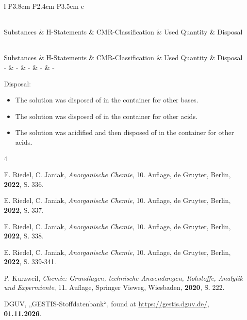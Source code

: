 \documentclass[
	a4paper,										%
	12pt,											%
	twoside,										%
	headsepline,								%
	footsepline,									%
	captions=tableheading,					%
]{scrartcl}
\newcommand{\langetabelle}[6]{  %
	\begin{centering}           %
		{\begin{longtable}[#3]{#4}
				\caption{#2\label{tab: #1}}\\				
				\hline
				#5
				\hline
				\endfirsthead
                \caption{#2\label{tab: #1}}\\
				\hline
				#5
				\hline
				\endhead
				#6												
				\hline 
		\end{longtable}}
\end{centering}}
\begin{document}
\langetabelle
	{KMR_leer}
	{Carcinogenic, mutagenic or reprotoxic hazardous substances used (CMR).}
	{H}
	{l P{3.8cm} P{2.4cm} P{3.5cm} c}
	{Substances & H-Statements & CMR-Classification & Used Quantity & Disposal \\}
	{ - & - & - & - & - \\}
	
Disposal: \\
\begin{itemize}
	\item[(1)] The solution was disposed of in the container for other bases. 
	\item[(2)] The solution was disposed of in the container for other acids.
	\item[(3)] The solution was acidified and then disposed of in the container for other acids.
\end{itemize}	

\begin{thebibliography}{4} %

						{E. Riedel, C. Janiak}, 
			\textit	{Anorganische Chemie}, 
						{10. Auflage}, 
						{de Gruyter}, 
						{Berlin}, 
			\textbf	{2022}, 
			S.			{336}.

						{E. Riedel, C. Janiak}, 
			\textit	{Anorganische Chemie}, 
						{10. Auflage}, 
						{de Gruyter}, 
						{Berlin}, 
			\textbf	{2022}, 
			S.			{337}.

						{E. Riedel, C. Janiak}, 
			\textit	{Anorganische Chemie}, 
						{10. Auflage}, 
						{de Gruyter}, 
						{Berlin}, 
			\textbf	{2022}, 
			S.			{338}.
	
						{E. Riedel, C. Janiak}, 
			\textit	{Anorganische Chemie}, 
						{10. Auflage}, 
						{de Gruyter}, 
						{Berlin}, 
			\textbf	{2022}, 
			S.			{339-341}.

						{P. Kurzweil}, 
			\textit	{Chemie: Grundlagen, technische Anwendungen, Rohstoffe, Analytik und Expermiente}, 
						{11. Auflage}, 
						{Springer Vieweg}, 
						{Wiesbaden}, 
			\textbf	{2020}, 
			S.			{222}.


						{DGUV}, 
						„{GESTIS-Stoffdatenbank}“, found at
			\url		{https://gestis.dguv.de/}, 
			\textbf	{01.11.2026}.
			
\end{thebibliography}

\newpage
	
\end{document}

